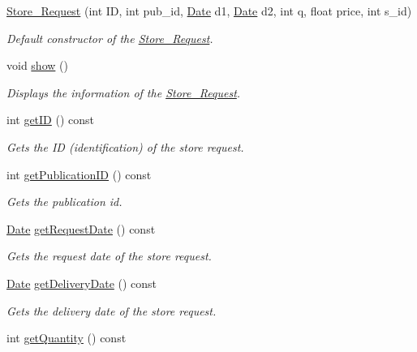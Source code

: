 \begin{DoxyCompactItemize}
\item 
\hyperlink{class_store___request_a38aa663a0d31c17aad7629e61509df21}{Store\+\_\+\+Request} (int ID, int pub\+\_\+id, \hyperlink{class_date}{Date} d1, \hyperlink{class_date}{Date} d2, int q, float price, int s\+\_\+id)
\begin{DoxyCompactList}\small\item\em Default constructor of the \hyperlink{class_store___request}{Store\+\_\+\+Request}. \end{DoxyCompactList}\item 
void \hyperlink{class_store___request_a1827180c3d971d1e6a4e6bfc85641019}{show} ()
\begin{DoxyCompactList}\small\item\em Displays the information of the \hyperlink{class_store___request}{Store\+\_\+\+Request}. \end{DoxyCompactList}\item 
int \hyperlink{class_store___request_aea346d2504acd89a30dd7aa79b633e0e}{get\+ID} () const
\begin{DoxyCompactList}\small\item\em Gets the ID (identification) of the store request. \end{DoxyCompactList}\item 
int \hyperlink{class_store___request_a50429baf56bd03b19c8d53d00e8af756}{get\+Publication\+ID} () const
\begin{DoxyCompactList}\small\item\em Gets the publication id. \end{DoxyCompactList}\item 
\hyperlink{class_date}{Date} \hyperlink{class_store___request_ad7e54515056bd56878bb933a4ccff2a2}{get\+Request\+Date} () const
\begin{DoxyCompactList}\small\item\em Gets the request date of the store request. \end{DoxyCompactList}\item 
\hyperlink{class_date}{Date} \hyperlink{class_store___request_af659200be3b40797cc7f44b43febac85}{get\+Delivery\+Date} () const
\begin{DoxyCompactList}\small\item\em Gets the delivery date of the store request. \end{DoxyCompactList}\item 
int \hyperlink{class_store___request_aad810d40b6c8cfd55276cd069c2309f8}{get\+Quantity} () const

\end{DoxyCompactItemize}
